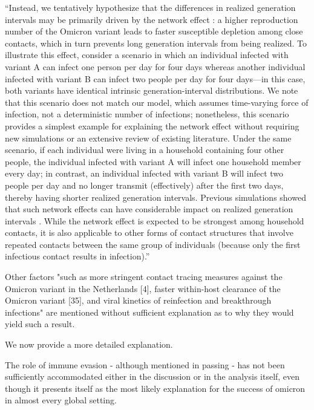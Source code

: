 \documentclass[12pt]{article}
\newcommand{\revtext}{\textsf}
\begin{document}
``Instead, we tentatively hypothesize that the differences in realized generation intervals may be primarily driven by the network effect \citep{park2020inferring,hart2022generation}: a higher reproduction number of the Omicron variant leads to faster susceptible depletion among close contacts, which in turn prevents long generation intervals from being realized. 
To illustrate this effect, consider a scenario in which an individual infected with variant A can infect one person per day for four days whereas another individual infected with variant B can infect two people per day for four days---in this case, both variants have identical intrinsic generation-interval distributions.
We note that this scenario does not match our model, which assumes time-varying force of infection, not a deterministic number of infections; nonetheless, this scenario provides a simplest example for explaining the network effect without requiring new simulations or an extensive review of existing literature.
Under the same scenario, if each individual were living in a household containing four other people, the individual infected with variant A will infect one household member every day; in contrast, an individual infected with variant B will infect two people per day and no longer transmit (effectively) after the first two days, thereby having shorter realized generation intervals.
Previous simulations showed that such network effects can have considerable impact on realized generation intervals \citep{park2020inferring}.
While the network effect is expected to be strongest among household contacts, it is also applicable to other forms of contact structures that involve repeated contacts between the same group of individuals (because only the first infectious contact results in infection).''

\revtext{Other factors "such as more stringent contact tracing measures against the Omicron variant in the Netherlands [4], faster within-host clearance of the Omicron variant [35], and viral kinetics of reinfection and breakthrough infections" are mentioned without sufficient explanation as to why they would yield such a result.}

We now provide a more detailed explanation.

\revtext{The role of immune evasion - although mentioned in passing - has not been sufficiently accommodated either in the discussion or in the analysis itself, even though it presents itself as the most likely explanation for the success of omicron in almost every global setting.}
\end{document}
